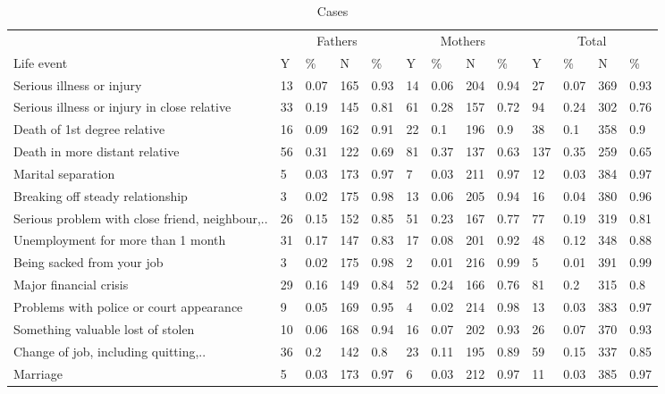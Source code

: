 \documentclass[]{article}
\begin{document}
\begin{table}[t]

\caption{\label{tab:unnamed-chunk-2}Cases}
\begin{tabular}{l|l|l|l|l|l|l|l|l|l|l|l|l}
\hline
\multicolumn{1}{c|}{ } & \multicolumn{4}{c|}{Fathers} & \multicolumn{4}{c|}{Mothers} & \multicolumn{4}{c}{Total} \\
\cline{2-5} \cline{6-9} \cline{10-13}
Life event & Y & \% & N & \% & Y & \% & N & \% & Y & \% & N & \%\\
\hline
Serious illness or injury & 13 & 0.07 & 165 & 0.93 & 14 & 0.06 & 204 & 0.94 & 27 & 0.07 & 369 & 0.93\\
\hline
Serious illness or injury in close relative & 33 & 0.19 & 145 & 0.81 & 61 & 0.28 & 157 & 0.72 & 94 & 0.24 & 302 & 0.76\\
\hline
Death of 1st degree relative & 16 & 0.09 & 162 & 0.91 & 22 & 0.1 & 196 & 0.9 & 38 & 0.1 & 358 & 0.9\\
\hline
Death in more distant relative & 56 & 0.31 & 122 & 0.69 & 81 & 0.37 & 137 & 0.63 & 137 & 0.35 & 259 & 0.65\\
\hline
Marital separation & 5 & 0.03 & 173 & 0.97 & 7 & 0.03 & 211 & 0.97 & 12 & 0.03 & 384 & 0.97\\
\hline
Breaking off steady relationship & 3 & 0.02 & 175 & 0.98 & 13 & 0.06 & 205 & 0.94 & 16 & 0.04 & 380 & 0.96\\
\hline
Serious problem with close friend, neighbour,.. & 26 & 0.15 & 152 & 0.85 & 51 & 0.23 & 167 & 0.77 & 77 & 0.19 & 319 & 0.81\\
\hline
Unemployment for more than 1 month & 31 & 0.17 & 147 & 0.83 & 17 & 0.08 & 201 & 0.92 & 48 & 0.12 & 348 & 0.88\\
\hline
Being sacked from your job & 3 & 0.02 & 175 & 0.98 & 2 & 0.01 & 216 & 0.99 & 5 & 0.01 & 391 & 0.99\\
\hline
Major financial crisis & 29 & 0.16 & 149 & 0.84 & 52 & 0.24 & 166 & 0.76 & 81 & 0.2 & 315 & 0.8\\
\hline
Problems with police or court appearance & 9 & 0.05 & 169 & 0.95 & 4 & 0.02 & 214 & 0.98 & 13 & 0.03 & 383 & 0.97\\
\hline
Something valuable lost of stolen & 10 & 0.06 & 168 & 0.94 & 16 & 0.07 & 202 & 0.93 & 26 & 0.07 & 370 & 0.93\\
\hline
Change of job, including quitting,.. & 36 & 0.2 & 142 & 0.8 & 23 & 0.11 & 195 & 0.89 & 59 & 0.15 & 337 & 0.85\\
\hline
Marriage & 5 & 0.03 & 173 & 0.97 & 6 & 0.03 & 212 & 0.97 & 11 & 0.03 & 385 & 0.97\\

\end{tabular}
\end{table}
\end{document}
